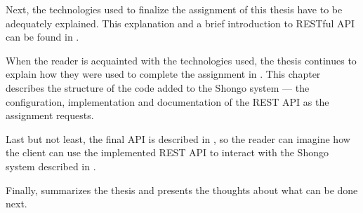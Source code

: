 Next, the technologies used to finalize the assignment of this thesis have to be adequately explained. This explanation and a brief introduction to RESTful API can be found in .

When the reader is acquainted with the technologies used, the thesis continues to explain how they were used to complete the assignment in . This chapter describes the structure of the code added to the Shongo system --- the configuration, implementation and documentation of the REST API as the assignment requests.

Last but not least, the final API is described in , so the reader can imagine how the client can use the implemented REST API to interact with the Shongo system described in .

Finally,  summarizes the thesis and presents the thoughts about what can be done next.

